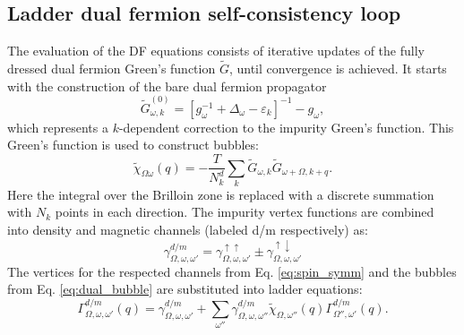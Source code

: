 \documentclass[3p,times,procedia]{elsarticle}
\begin{document}
\subsection{Ladder dual fermion self-consistency loop}
The evaluation of the DF equations consists of iterative updates of the fully dressed dual fermion Green's function $\tilde G$, until convergence is achieved. It starts with the construction of the bare dual fermion propagator
\begin{equation}
\tilde G^{(0)}_{\omega,k} = \left[g_{\omega}^{-1} + \Delta_\omega - \varepsilon_k\right]^{-1} - g_{\omega}, \label{eq:gd0}
\end{equation}
which represents a $k$-dependent correction to the impurity Green's function. This Green's function is used to construct bubbles: 
\begin{equation}\label{eq:dual_bubble}
\tilde \chi_{\Omega\omega}(q) = -\frac{T}{N_k^d} \sum_k \tilde G_{\omega, k} \tilde G_{\omega + \Omega, k+q}.
\end{equation}
Here the integral over the Brilloin zone is replaced with a discrete summation with $N_k$ points in each direction. The impurity vertex functions are combined into density and magnetic channels (labeled d/m respectively) as: 
\begin{equation}\label{eq:spin_symm}
\gamma^{d/m}_{\Omega,\omega,\omega'} = \gamma^{\uparrow\uparrow}_{\Omega,\omega,\omega'} \pm \gamma^{\uparrow\downarrow}_{\Omega,\omega,\omega'}
\end{equation}
The vertices for the respected channels from Eq. \ref{eq:spin_symm} and the bubbles from Eq. \ref{eq:dual_bubble} are substituted into ladder equations:
\begin{equation}\label{eq:dual_ladder}
\Gamma^{d/m}_{\Omega,\omega,\omega'}(q) = \gamma^{d/m}_{\Omega,\omega,\omega'} + \sum_{\omega''} \gamma^{d/m}_{\Omega,\omega,\omega''} \tilde\chi_{\Omega,\omega''}(q) \Gamma^{d/m}_{\Omega'',\omega'}(q).
\end{equation}
\end{document}
